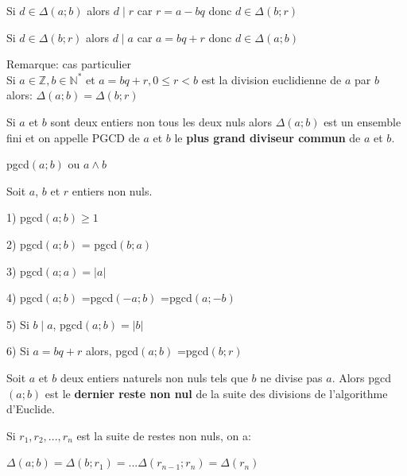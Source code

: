 \documentclass[french]{book}
\begin{document}
\begin{demo}

Si $d\in \Delta\left( a;b\right)$ alors $d\mid r$ car $r=a-bq$ donc $d\in \Delta\left( b;r\right)$

Si $d\in \Delta\left( b;r\right)$ alors $d\mid a$ car $a=bq+r$ donc $d\in \Delta\left( a;b\right)$


Remarque: cas particulier\\

Si $a\in \mathbb{Z}, b\in\mathbb{N}^{*}$ et $a=bq+r, 0 \leq r < b $ est la division euclidienne de $a$ par $b$ alors: $\Delta\left( a;b\right)=\Delta\left( b;r\right)  $


\end{demo}

\begin{defn}

Si $a$ et $b$ sont deux entiers non tous les deux nuls alors $ \Delta\left( a;b\right)$ est un ensemble fini et on appelle PGCD de $a$ et $b$ le \textbf{plus grand diviseur commun} de $a$ et $b$.
\end{defn}

\begin{rem}
pgcd$(a;b)$ ou $a\wedge b$
\end{rem}

\begin{prop}
Soit $a$, $b$ et $r$ entiers non nuls.

1) pgcd$(a;b)\geq 1$

2) pgcd$(a;b)$ = pgcd$(b;a)$

3) pgcd$(a;a)=\vert a\vert$

4) pgcd$(a;b)$ =pgcd$(-a;b)$ =pgcd$(a;-b)$

5) Si $b\mid a$, pgcd$(a;b)=\vert b \vert$

6) Si $a=bq+r$  alors,  pgcd$(a;b)$ =pgcd$(b;r)$ 


\end{prop}

\begin{exemple}

Soit $a$ et $b$ deux entiers naturels non nuls tels que $b$ ne divise pas $a$. Alors pgcd$(a;b)$ est le \textbf{dernier reste non nul} de la suite des divisions de l'algorithme d'Euclide.

Si $r_{1},r_{2},...,r_{n}$ est la suite de restes non nuls, on a:

$ \Delta\left( a;b\right)= \Delta\left( b;r_{1}\right)=... \Delta\left( r_{n-1};r_{n}\right)= \Delta\left( r_{n}\right)$


\end{exemple}
\end{document}
